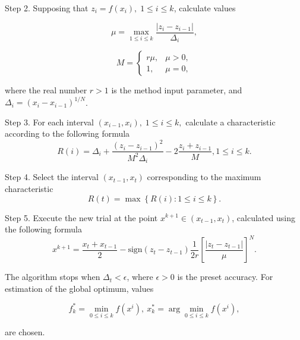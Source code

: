 \documentclass[mathematics,article,accept,pdftex,moreauthors]{Definitions/mdpi}
\begin{document}
Step 2. Supposing that  $z_i=f(x_i), \; 1\leq i \leq k$, calculate values 
\begin{linenomath}
\begin{equation}\label{mu}
\mu = \max_{1\leq i \leq k}\frac{\left|z_i-z_{i-1}\right|}{\Delta_i},
\end{equation}
\end{linenomath}
\begin{linenomath}
\begin{equation}
M = \left\{
   \begin{array}{lr}
     r\mu, & \mu > 0,\\
     1, & \mu = 0,
   \end{array}
\right.
\end{equation}
\end{linenomath}
where the real number $r>1$ is the method input parameter, and $\Delta_i=\left(x_i-x_{i-1}\right)^{1/N}$.


Step 3. For each interval $(x_{i-1}, x_i), \; 1\leq i \leq k,$ calculate a characteristic according to the following formula
\begin{equation}\label{R}
R(i)=\Delta_i+\frac{(z_i-z_{i-1})^2}{M^2\Delta_i}-2\frac{z_i+z_{i-1}}{M},1 \leq i \leq k.
\end{equation}


Step 4. Select the interval $(x_{t-1},x_t)$ corresponding to the maximum characteristic
\begin{equation}\label{MaxR}
R(t)=\max{\left\{R(i): 1 \leq i \leq k \right\}}.
\end{equation}

Step 5. Execute the new trial at the point $x^{k+1}\in(x_{t-1},x_t)$, calculated using the following formula
\begin{equation}\label{NewX}
x^{k+1} = \frac{x_t+x_{t-1}}{2} - \mathrm{sign}(z_t-z_{t-1})\frac{1}{2r}\left[\frac{\left|z_t-z_{t-1}\right|}{\mu}\right]^N.
\end{equation}

The algorithm stops when $\Delta_t<\epsilon$, where $\epsilon>0$ is the preset accuracy. For estimation of the global optimum, values
\begin{linenomath}
\begin{equation}
f_k^\ast=\min_{0\leq i \leq k}f(x^i), \ x_k^\ast=\arg \min_{0\leq i \leq k}f(x^i),
\end{equation}
\end{linenomath}
are chosen.
\end{document}
